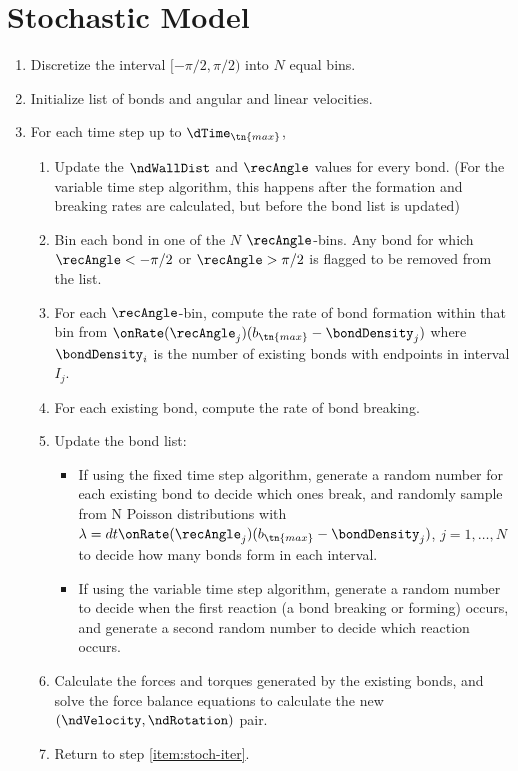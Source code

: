 \section{Stochastic Model}
\label{sec:stochastic-model}

\begin{enumerate}
\item Discretize the interval $[-\pi/2, \pi/2)$ into $N$ equal bins.
\item Initialize list of bonds and angular and linear velocities. 
\item For each time step up to $\dTime_\tn{max}$, \label{item:stoch-iter}
  \begin{enumerate}
  \item Update the $\ndWallDist$ and $\recAngle$ values for every bond. (For the
    variable time step algorithm, this happens after the formation and
    breaking rates are calculated, but before the bond list is updated)
  \item Bin each bond in one of the $N$ $\recAngle$-bins. Any bond for
    which $\recAngle < -\pi/2$ or $\recAngle > \pi/2$ is flagged to be
    removed from the list.
  \item For each $\recAngle$-bin, compute the rate of bond formation
    within that bin from $\onRate(\recAngle_j) (b_\tn{max} - \bondDensity_j)$ where
    $\bondDensity_i$ is the number of existing bonds with endpoints in interval
    $I_j$.
  \item For each existing bond, compute the rate of bond breaking.
  \item Update the bond list:
    \begin{itemize}
    \item If using the fixed time step algorithm, generate a random
      number for each existing bond to decide which ones break, and
      randomly sample from N Poisson distributions with $\lambda = dt
      \onRate(\recAngle_j) (b_\tn{max} - \bondDensity_j)$, $j = 1, \hdots, N$ to
      decide how many bonds form in each interval.
    \item If using the variable time step algorithm, generate a random
      number to decide when the first reaction (a bond breaking or
      forming) occurs, and generate a second random number to decide
      which reaction occurs.
    \end{itemize}
  \item Calculate the forces and torques generated by the existing
    bonds, and solve the force balance equations to calculate the new
    $(\ndVelocity, \ndRotation)$ pair.
  \item Return to step \ref{item:stoch-iter}.
  \end{enumerate}
\end{enumerate}
